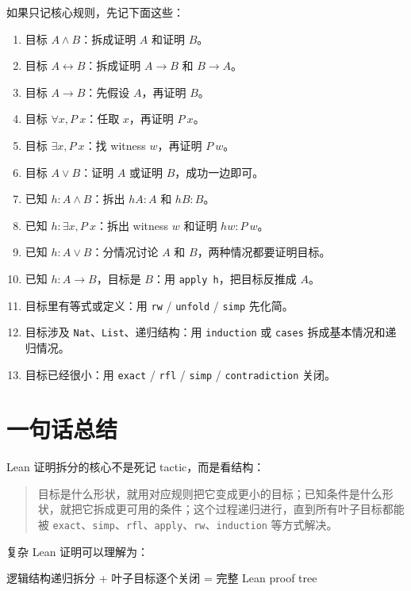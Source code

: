 \documentclass[UTF8,12pt]{ctexart}
\begin{document}
如果只记核心规则，先记下面这些：

\begin{enumerate}
  \item 目标 \(A \land B\)：拆成证明 \(A\) 和证明 \(B\)。
  \item 目标 \(A \leftrightarrow B\)：拆成证明 \(A \to B\) 和 \(B \to A\)。
  \item 目标 \(A \to B\)：先假设 \(A\)，再证明 \(B\)。
  \item 目标 \(\forall x, P\ x\)：任取 \(x\)，再证明 \(P\ x\)。
  \item 目标 \(\exists x, P\ x\)：找 witness \(w\)，再证明 \(P\ w\)。
  \item 目标 \(A \lor B\)：证明 \(A\) 或证明 \(B\)，成功一边即可。
  \item 已知 \(h : A \land B\)：拆出 \(hA : A\) 和 \(hB : B\)。
  \item 已知 \(h : \exists x, P\ x\)：拆出 witness \(w\) 和证明 \(hw : P\ w\)。
  \item 已知 \(h : A \lor B\)：分情况讨论 \(A\) 和 \(B\)，两种情况都要证明目标。
  \item 已知 \(h : A \to B\)，目标是 \(B\)：用 \texttt{apply h}，把目标反推成 \(A\)。
  \item 目标里有等式或定义：用 \texttt{rw} / \texttt{unfold} / \texttt{simp} 先化简。
  \item 目标涉及 \texttt{Nat}、\texttt{List}、递归结构：用 \texttt{induction} 或 \texttt{cases} 拆成基本情况和递归情况。
  \item 目标已经很小：用 \texttt{exact} / \texttt{rfl} / \texttt{simp} / \texttt{contradiction} 关闭。
\end{enumerate}

\section{一句话总结}

Lean 证明拆分的核心不是死记 tactic，而是看结构：

\begin{quote}
目标是什么形状，就用对应规则把它变成更小的目标；已知条件是什么形状，就把它拆成更可用的条件；这个过程递归进行，直到所有叶子目标都能被 \texttt{exact}、\texttt{simp}、\texttt{rfl}、\texttt{apply}、\texttt{rw}、\texttt{induction} 等方式解决。
\end{quote}

复杂 Lean 证明可以理解为：

\begin{Tree}
逻辑结构递归拆分
+
叶子目标逐个关闭
=
完整 Lean proof tree
\end{Tree}
\end{document}
